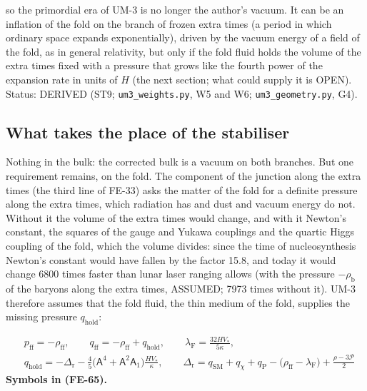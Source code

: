 \documentclass[
  10pt,
]{article}
\begin{document}
so the primordial era of UM-3 is no longer the author's vacuum. It can
be an inflation of the fold on the branch of frozen extra times (a
period in which ordinary space expands exponentially), driven by the
vacuum energy of a field of the fold, as in general relativity, but only
if the fold fluid holds the volume of the extra times fixed with a
pressure that grows like the fourth power of the expansion rate in units
of \(H\) (the next section; what could supply it is OPEN). Status:
DERIVED (ST9; \texttt{um3\_weights.py}, W5 and W6;
\texttt{um3\_geometry.py}, G4).

\hypertarget{what-takes-the-place-of-the-stabiliser}{%
\subsection{What takes the place of the
stabiliser}\label{what-takes-the-place-of-the-stabiliser}}

Nothing in the bulk: the corrected bulk is a vacuum on both branches.
But one requirement remains, on the fold. The component of the junction
along the extra times (the third line of FE-33) asks the matter of the
fold for a definite pressure along the extra times, which radiation has
and dust and vacuum energy do not. Without it the volume of the extra
times would change, and with it Newton's constant, the squares of the
gauge and Yukawa couplings and the quartic Higgs coupling of the fold,
which the volume divides: since the time of nucleosynthesis Newton's
constant would have fallen by the factor 15.8, and today it would change
6800 times faster than lunar laser ranging allows (with the pressure
\(-\rho_{\mathrm{b}}\) of the baryons along the extra times, ASSUMED;
7973 times without it). UM-3 therefore assumes that the fold fluid, the
thin medium of the fold, supplies the missing pressure
\(q_{\mathrm{hold}}\):

\[
\begin{aligned}
&p_{\mathrm{ff}} = -\rho_{\mathrm{ff}},\qquad q_{\mathrm{ff}} = -\rho_{\mathrm{ff}} + q_{\mathrm{hold}},\qquad
 \lambda_{\mathrm{F}} = \frac{32HV_*}{5\kappa},\\
&q_{\mathrm{hold}} = -\Delta_{\mathrm{r}} - \frac45\big(\mathsf{A}^4 + \mathsf{A}^2\mathsf{A}_1\big)\frac{HV_*}{\kappa},\qquad
 \Delta_{\mathrm{r}} = q_{\mathrm{SM}} + q_\chi + q_{\mathrm{P}} - \big(\rho_{\mathrm{ff}} - \lambda_{\mathrm{F}}\big) + \frac{\rho - 3\mathcal{P}}{2}
\end{aligned} \tag{FE-65}
\] \textbf{Symbols in (FE-65).}
\end{document}
